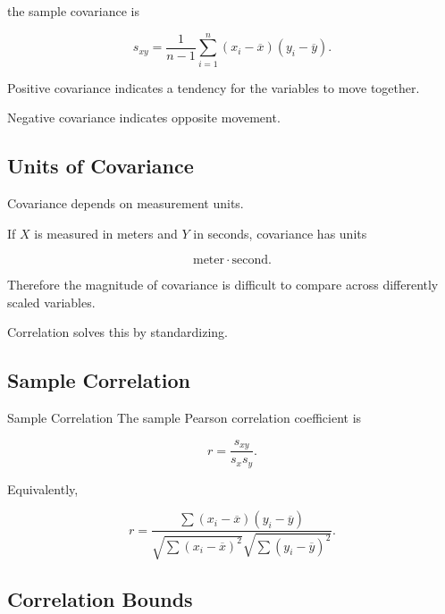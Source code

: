 the sample covariance is

\[
\boxed{
s_{xy}
=
\frac1{n-1}
\sum_{i=1}^{n}
(x_i-\overline{x})
(y_i-\overline{y}).
}
\]

Positive covariance indicates a tendency for the variables to move
together.

Negative covariance indicates opposite movement.

\subsection{Units of Covariance}
\label{subsec:covariance-units}

Covariance depends on measurement units.

If \(X\) is measured in meters and \(Y\) in seconds, covariance has units

\[
\text{meter}\cdot\text{second}.
\]

Therefore the magnitude of covariance is difficult to compare across
differently scaled variables.

Correlation solves this by standardizing.

\subsection{Sample Correlation}
\label{subsec:sample-correlation}

\begin{definitionbox}{Sample Correlation}
The sample Pearson correlation coefficient is

\[
\boxed{
r
=
\frac{
s_{xy}
}{
s_xs_y
}.
}
\]
\end{definitionbox}

Equivalently,

\[
\boxed{
r
=
\frac{
\sum
(x_i-\overline{x})
(y_i-\overline{y})
}{
\sqrt{
\sum
(x_i-\overline{x})^2
}
\sqrt{
\sum
(y_i-\overline{y})^2
}
}.
}
\]

\subsection{Correlation Bounds}
\label{subsec:correlation-bounds}

